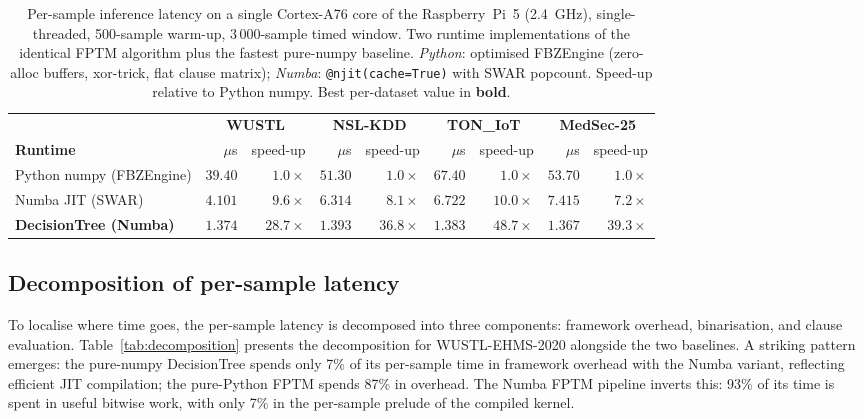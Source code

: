 \documentclass[journal,10pt]{IEEEtran}
\begin{document}
\begin{table}[t]
\centering\small
\caption{Per-sample inference latency on a single Cortex-A76 core of the
         Raspberry~Pi~5 (2.4~GHz), single-threaded, 500-sample warm-up,
         3\,000-sample timed window.  Two runtime implementations of the
         identical FPTM algorithm plus the fastest pure-numpy baseline.
         \emph{Python}: optimised FBZEngine (zero-alloc buffers, xor-trick,
         flat clause matrix);
         \emph{Numba}: \texttt{@njit(cache=True)} with SWAR popcount.
         Speed-up relative to Python numpy.
         Best per-dataset value in \textbf{bold}.}
\label{tab:pi5_runtime}
\begin{tabular}{lrrrrrrrr}
\toprule
 & \multicolumn{2}{c}{\textbf{WUSTL}} & \multicolumn{2}{c}{\textbf{NSL-KDD}} & \multicolumn{2}{c}{\textbf{TON\_IoT}} & \multicolumn{2}{c}{\textbf{MedSec-25}} \\
\cmidrule(lr){2-3}\cmidrule(lr){4-5}\cmidrule(lr){6-7}\cmidrule(lr){8-9}
\textbf{Runtime} & $\mu$s & speed-up & $\mu$s & speed-up & $\mu$s & speed-up & $\mu$s & speed-up \\
\midrule
Python numpy (FBZEngine) & $39.40$ & $1.0\times$ & $51.30$ & $1.0\times$ & $67.40$ & $1.0\times$ & $53.70$ & $1.0\times$ \\
Numba JIT (SWAR)         & $4.101$ & $9.6\times$ & $6.314$ & $8.1\times$ & $6.722$ & $10.0\times$ & $7.415$ & $7.2\times$ \\
\midrule
\textbf{DecisionTree (Numba)} & $\mathbf{1.374}$ & $\mathbf{28.7\times}$ & $\mathbf{1.393}$ & $\mathbf{36.8\times}$ & $\mathbf{1.383}$ & $\mathbf{48.7\times}$ & $\mathbf{1.367}$ & $\mathbf{39.3\times}$ \\
\bottomrule
\end{tabular}
\end{table}

\subsection{Decomposition of per-sample latency}
\label{sec:res-decomp}

To localise where time goes, the per-sample latency is decomposed into
three components: framework overhead, binarisation, and clause
evaluation. Table~\ref{tab:decomposition} presents the decomposition
for WUSTL-EHMS-2020 alongside the two baselines. A striking pattern
emerges: the pure-numpy DecisionTree spends only 7\% of its per-sample
time in framework overhead with the Numba variant, reflecting efficient
JIT compilation; the
pure-Python FPTM spends 87\% in overhead. The Numba FPTM
pipeline inverts this: 93\% of its time is spent in useful bitwise
work, with only 7\% in the per-sample prelude of the compiled kernel.
\end{document}
